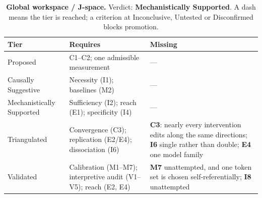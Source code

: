 \begin{table}[H]
\centering
\footnotesize
\caption{\textbf{Global workspace / J-space.} Verdict: \textbf{Mechanistically Supported}. A dash means the tier is reached; a criterion at
Inconclusive, Untested or Disconfirmed blocks promotion.}
\label{tab:workspace-verdict}
\renewcommand{\arraystretch}{1.18}
\begin{tabular}{@{}l>{\raggedright\arraybackslash}p{3.6cm}>{\raggedright\arraybackslash}p{4.4cm}@{}}
\toprule
\textbf{Tier} & \textbf{Requires} & \textbf{Missing} \\
\midrule
Proposed & C1--C2; one admissible measurement & --- \\
\addlinespace[2pt]
Causally Suggestive & Necessity (I1); baselines (M2) & --- \\
\addlinespace[2pt]
Mechanistically Supported & Sufficiency (I2); reach (E1); specificity (I4) & --- \\
\addlinespace[2pt]
Triangulated & Convergence (C3); replication (E2/E4); dissociation (I6) & \textbf{C3}: nearly every intervention edits along the same directions; \textbf{I6} single rather than double; \textbf{E4} one model family \\
\addlinespace[2pt]
Validated & Calibration (M1--M7); interpretive audit (V1--V5); reach (E2, E4) & \textbf{M7} unattempted, and one token set is chosen self-referentially; \textbf{I8} unattempted \\
\bottomrule
\end{tabular}
\end{table}
